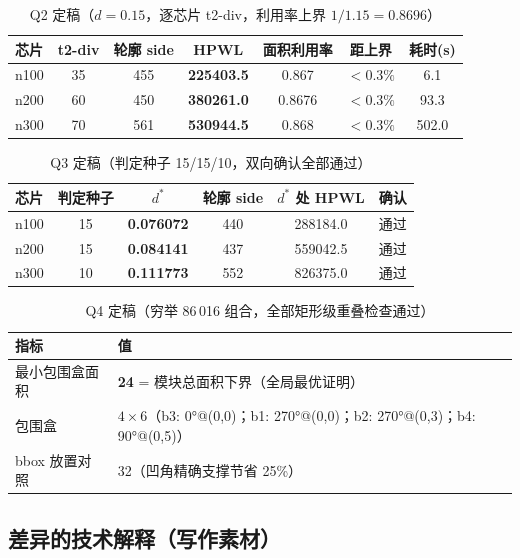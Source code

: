 \documentclass[12pt,a4paper]{article}
\begin{document}
\begin{table}[H]
\centering
\small
\caption{Q2 定稿（$d=0.15$，逐芯片 t2-div，利用率上界 $1/1.15=0.8696$）}
\begin{tabular}{lcccccc}
\toprule
芯片 & t2-div & 轮廓 side & HPWL & 面积利用率 & 距上界 & 耗时(s) \\
\midrule
n100 & 35 & 455 & \textbf{225403.5} & 0.867 & $<0.3\%$ & 6.1 \\
n200 & 60 & 450 & \textbf{380261.0} & 0.8676 & $<0.3\%$ & 93.3 \\
n300 & 70 & 561 & \textbf{530944.5} & 0.868 & $<0.3\%$ & 502.0 \\
\bottomrule
\end{tabular}
\end{table}

\begin{table}[H]
\centering
\small
\caption{Q3 定稿（判定种子 15/15/10，双向确认全部通过）}
\begin{tabular}{lccccc}
\toprule
芯片 & 判定种子 & $d^*$ & 轮廓 side & $d^*$ 处 HPWL & 确认 \\
\midrule
n100 & 15 & \textbf{0.076072} & 440 & 288184.0 & 通过 \\
n200 & 15 & \textbf{0.084141} & 437 & 559042.5 & 通过 \\
n300 & 10 & \textbf{0.111773} & 552 & 826375.0 & 通过 \\
\bottomrule
\end{tabular}
\end{table}

\begin{table}[H]
\centering
\small
\caption{Q4 定稿（穷举 86\,016 组合，全部矩形级重叠检查通过）}
\begin{tabular}{ll}
\toprule
指标 & 值 \\
\midrule
最小包围盒面积 & \textbf{24} = 模块总面积下界（全局最优证明） \\
包围盒 & $4\times6$（b3: 0°@(0,0)；b1: 270°@(0,0)；b2: 270°@(0,3)；b4: 90°@(0,5)） \\
bbox 放置对照 & 32（凹角精确支撑节省 25\%） \\
\bottomrule
\end{tabular}
\end{table}

\subsection{差异的技术解释（写作素材）}
\end{document}
